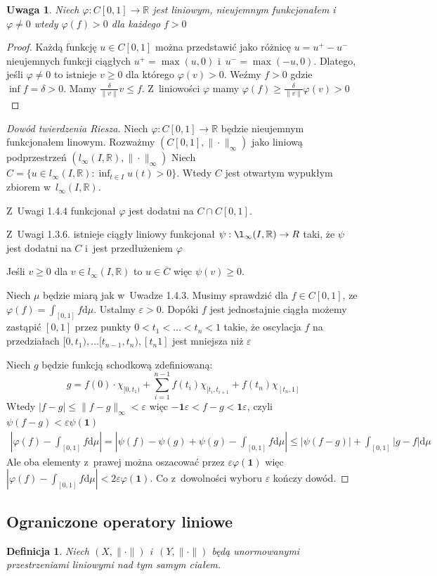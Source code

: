 \documentclass[10pt]{article}
\renewcommand{\[}{\begin{equation}}
\renewcommand{\]}{\end{equation}}
\newcommand{\R}{{\ensuremath{\mathbb R}}}
\newcommand{\dd}{\mathrm{d}}
\newcommand{\norm}{\|\cdot\|}
\newtheorem{uw}[subsubsection]{Uwaga}
\newtheorem{de}[subsubsection]{Definicja}
\begin{document}
\begin{uw}
	Niech $\varphi:C[0,1] \to \R$ jest liniowym, nieujemnym funkcjonałem i~$\varphi \not = 0$ wtedy  $\varphi(f) >0 $ dla każdego $f>0$ 
\end{uw}
\begin{proof}
	Każdą funkcję $u \in C[0,1]$ można przedstawić jako różnicę $u=u^+-u^-$ nieujemnych funkcji ciągłych $u^+ = \max(u,0)$ i~$u^- = \max(-u,0)$.
	Dlatego, jeśli $\varphi\not = 0$ to istnieje $v\ge 0$ dla którego $\varphi(v)>0$.
	Weźmy $f>0$ gdzie $\inf f = \delta >0$. Mamy $\frac{\delta}{\|v\|}v\le f$. Z~liniowości $\varphi$ mamy $\varphi(f)\ge \frac{\delta}{\|v\|}\varphi(v)>0$
\end{proof}
\begin{proof}[Dowód twierdzenia Riesza]
	Niech $\varphi: C[0,1] \to \R$ będzie  nieujemnym funkcjonałem linowym.
	Rozważmy $\left( C[0,1],\norm_\infty \right)$ jako liniową podprzestrzeń $\left( l_\infty (I,\R),\norm_\infty \right)$
	Niech $C=\{ u\in l_\infty (I,\R): \inf_{t \in I} u(t) >0\}$. Wtedy $C$ jest otwartym wypukłym zbiorem w~$l_\infty(I,\R)$. \par
	Z~Uwagi 1.4.4 funkcjonał $\varphi$ jest dodatni na $C \cap C[0,1]$.\par
	Z~Uwagi 1.3.6.	istnieje ciągły liniowy funkcjonał $\psi:\l_\infty(I,\R) \to R$ taki, że $\psi$ jest dodatni na $C$ i~jest przedłużeniem $\varphi$\par
	Jeśli $v\ge 0$ dla $v \in l_\infty (I,\R)$ to $u\in \overline{C}$ więc $\psi(v)\ge0$.\par
	Niech $\mu$ będzie miarą jak w~Uwadze 1.4.3.
	Musimy sprawdzić dla $f\in C[0,1]$, ze $\varphi(f) = \int_{[0,1]}f \dd \mu$.
	Ustalmy $\varepsilon>0$. Dopóki $f$ jest jednostajnie ciągła możemy zastąpić $[0,1]$ przez punkty $0<t_1<\ldots<t_n<1$
	takie, że oscylacja $f$ na przedziałach $[0,t_1),\ldots [t_{n-1},t_{n}), [t_n 1]$ jest mniejsza niż $\varepsilon$\par
	Niech $g$  będzie funkcją schodkową zdefiniowaną: 
	$$g= f(0)\cdot \chi_{[0,t_1)} + \sum_{i=1}^{n-1}f(t_i) \chi_{[t_i,t_{i+1}} + f(t_n) \chi_{[t_n,1]}$$
	Wtedy $|f-g| \le \|f-g\|_\infty<\varepsilon$ więc $-\mathbf{1} \varepsilon < f-g < \mathbf{1} \varepsilon$, 
	czyli $\psi(f-g) <\varepsilon \psi(\mathbf{1})$
 	\begin{multline}
	\left|\varphi(f) - \int_{[0,1]} f \dd \mu\right| = \left| \psi(f) - \psi(g) +\psi(g) - \int_{[0,1]} f \dd \mu \right|
	\le \left| \psi(f-g)\right| + \int_{[0,1]} \left| g - f \right| \dd\mu
	\nonumber
  \end{multline}
  Ale oba elementy z~prawej można oszacować przez $\varepsilon\varphi(\mathbf{1})$ więc $\left|\varphi(f) - \int_{[0,1]} f \dd \mu\right|<2\varepsilon\varphi(\mathbf{1})$.
  Co z~dowolności wyboru $\varepsilon$ kończy dowód.
\end{proof}

\subsection{Ograniczone operatory liniowe}
\begin{de}
Niech $(X,\norm)$ i~$(Y,\norm)$ będą unormowanymi przestrzeniami liniowymi nad tym samym ciałem.
\end{de}
\end{document}
